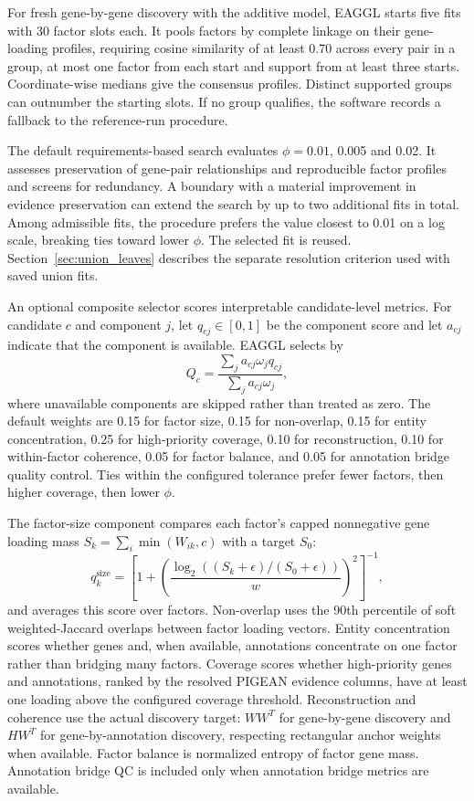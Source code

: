 \documentclass[11pt]{article}
\begin{document}
For fresh gene-by-gene discovery with the additive model, EAGGL starts five fits with 30 factor slots each. It pools factors by complete linkage on their gene-loading profiles, requiring cosine similarity of at least 0.70 across every pair in a group, at most one factor from each start and support from at least three starts. Coordinate-wise medians give the consensus profiles. Distinct supported groups can outnumber the starting slots. If no group qualifies, the software records a fallback to the reference-run procedure.

The default requirements-based search evaluates $\phi=0.01$, 0.005 and 0.02. It assesses preservation of gene-pair relationships and reproducible factor profiles and screens for redundancy. A boundary with a material improvement in evidence preservation can extend the search by up to two additional fits in total. Among admissible fits, the procedure prefers the value closest to 0.01 on a log scale, breaking ties toward lower $\phi$. The selected fit is reused. Section~\ref{sec:union_leaves} describes the separate resolution criterion used with saved union fits.

An optional composite selector scores interpretable candidate-level metrics. For candidate $c$ and component $j$, let $q_{cj} \in [0,1]$ be the component score and let $a_{cj}$ indicate that the component is available. EAGGL selects by
\begin{equation}
Q_c = \frac{\sum_j a_{cj}\omega_j q_{cj}}{\sum_j a_{cj}\omega_j},
\label{eq:eaggl_phi_composite_score}
\end{equation}
where unavailable components are skipped rather than treated as zero. The default weights are 0.15 for factor size, 0.15 for non-overlap, 0.15 for entity concentration, 0.25 for high-priority coverage, 0.10 for reconstruction, 0.10 for within-factor coherence, 0.05 for factor balance, and 0.05 for annotation bridge quality control. Ties within the configured tolerance prefer fewer factors, then higher coverage, then lower $\phi$.

The factor-size component compares each factor's capped nonnegative gene loading mass $S_k=\sum_i \min(W_{ik},c)$ with a target $S_0$:
\begin{equation}
q^{\mathrm{size}}_k = \left[1 + \left(\frac{\log_2((S_k+\epsilon)/(S_0+\epsilon))}{w}\right)^2\right]^{-1},
\end{equation}
and averages this score over factors. Non-overlap uses the 90th percentile of soft weighted-Jaccard overlaps between factor loading vectors. Entity concentration scores whether genes and, when available, annotations concentrate on one factor rather than bridging many factors. Coverage scores whether high-priority genes and annotations, ranked by the resolved PIGEAN evidence columns, have at least one loading above the configured coverage threshold. Reconstruction and coherence use the actual discovery target: $WW^T$ for gene-by-gene discovery and $HW^T$ for gene-by-annotation discovery, respecting rectangular anchor weights when available. Factor balance is normalized entropy of factor gene mass. Annotation bridge QC is included only when annotation bridge metrics are available.
\end{document}

